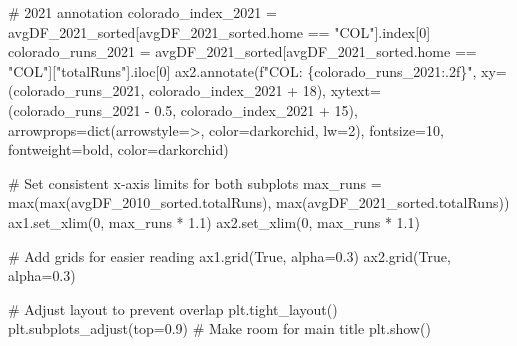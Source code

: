 \documentclass[
  letterpaper,
  DIV=11,
  numbers=noendperiod]{scrartcl}
\newenvironment{Shaded}{\begin{snugshade}}{\end{snugshade}}
\newcommand{\BuiltInTok}[1]{\textcolor[rgb]{0.00,0.23,0.31}{#1}}
\newcommand{\CommentTok}[1]{\textcolor[rgb]{0.37,0.37,0.37}{#1}}
\newcommand{\DecValTok}[1]{\textcolor[rgb]{0.68,0.00,0.00}{#1}}
\newcommand{\FloatTok}[1]{\textcolor[rgb]{0.68,0.00,0.00}{#1}}
\newcommand{\NormalTok}[1]{\textcolor[rgb]{0.00,0.23,0.31}{#1}}
\newcommand{\OperatorTok}[1]{\textcolor[rgb]{0.37,0.37,0.37}{#1}}
\newcommand{\SpecialCharTok}[1]{\textcolor[rgb]{0.37,0.37,0.37}{#1}}
\newcommand{\SpecialStringTok}[1]{\textcolor[rgb]{0.13,0.47,0.30}{#1}}
\newcommand{\StringTok}[1]{\textcolor[rgb]{0.13,0.47,0.30}{#1}}
\newcommand{\VariableTok}[1]{\textcolor[rgb]{0.07,0.07,0.07}{#1}}
\begin{document}
\begin{tcolorbox}
\begin{Shaded}
\begin{Highlighting}[]
\CommentTok{\# 2021 annotation}
\NormalTok{colorado\_index\_2021 }\OperatorTok{=}\NormalTok{ avgDF\_2021\_sorted[avgDF\_2021\_sorted.home }\OperatorTok{==} \StringTok{"COL"}\NormalTok{].index[}\DecValTok{0}\NormalTok{]}
\NormalTok{colorado\_runs\_2021 }\OperatorTok{=}\NormalTok{ avgDF\_2021\_sorted[avgDF\_2021\_sorted.home }\OperatorTok{==} \StringTok{"COL"}\NormalTok{][}\StringTok{"totalRuns"}\NormalTok{].iloc[}\DecValTok{0}\NormalTok{]}
\NormalTok{ax2.annotate(}\SpecialStringTok{f"COL: }\SpecialCharTok{\{}\NormalTok{colorado\_runs\_2021}\SpecialCharTok{:.2f\}}\SpecialStringTok{"}\NormalTok{, }
\NormalTok{             xy}\OperatorTok{=}\NormalTok{(colorado\_runs\_2021, colorado\_index\_2021 }\OperatorTok{+} \DecValTok{18}\NormalTok{), }
\NormalTok{             xytext}\OperatorTok{=}\NormalTok{(colorado\_runs\_2021 }\OperatorTok{{-}} \FloatTok{0.5}\NormalTok{, colorado\_index\_2021 }\OperatorTok{+} \DecValTok{15}\NormalTok{),}
\NormalTok{             arrowprops}\OperatorTok{=}\BuiltInTok{dict}\NormalTok{(arrowstyle}\OperatorTok{=}\StringTok{\textquotesingle{}{-}\textgreater{}\textquotesingle{}}\NormalTok{, color}\OperatorTok{=}\StringTok{\textquotesingle{}darkorchid\textquotesingle{}}\NormalTok{, lw}\OperatorTok{=}\DecValTok{2}\NormalTok{),}
\NormalTok{             fontsize}\OperatorTok{=}\DecValTok{10}\NormalTok{, fontweight}\OperatorTok{=}\StringTok{\textquotesingle{}bold\textquotesingle{}}\NormalTok{, color}\OperatorTok{=}\StringTok{\textquotesingle{}darkorchid\textquotesingle{}}\NormalTok{)}

\CommentTok{\# Set consistent x{-}axis limits for both subplots}
\NormalTok{max\_runs }\OperatorTok{=} \BuiltInTok{max}\NormalTok{(}\BuiltInTok{max}\NormalTok{(avgDF\_2010\_sorted.totalRuns), }\BuiltInTok{max}\NormalTok{(avgDF\_2021\_sorted.totalRuns))}
\NormalTok{ax1.set\_xlim(}\DecValTok{0}\NormalTok{, max\_runs }\OperatorTok{*} \FloatTok{1.1}\NormalTok{)}
\NormalTok{ax2.set\_xlim(}\DecValTok{0}\NormalTok{, max\_runs }\OperatorTok{*} \FloatTok{1.1}\NormalTok{)}

\CommentTok{\# Add grids for easier reading}
\NormalTok{ax1.grid(}\VariableTok{True}\NormalTok{, alpha}\OperatorTok{=}\FloatTok{0.3}\NormalTok{)}
\NormalTok{ax2.grid(}\VariableTok{True}\NormalTok{, alpha}\OperatorTok{=}\FloatTok{0.3}\NormalTok{)}

\CommentTok{\# Adjust layout to prevent overlap}
\NormalTok{plt.tight\_layout()}
\NormalTok{plt.subplots\_adjust(top}\OperatorTok{=}\FloatTok{0.9}\NormalTok{)  }\CommentTok{\# Make room for main title}
\NormalTok{plt.show()}


\end{Highlighting}
\end{Shaded}
\end{tcolorbox}
\end{document}
